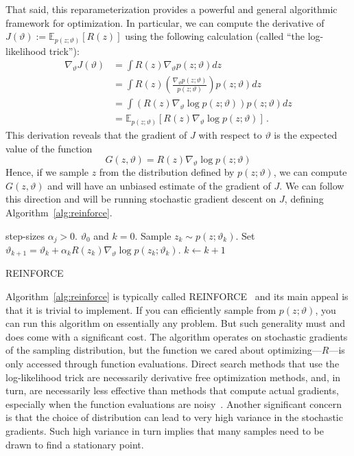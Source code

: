 \documentclass[11pt]{article}
\numberwithin{equation}{section}
\begin{document}
That said, this reparameterization provides a powerful and general algorithmic framework for optimization. In particular, we can compute the derivative of $J(\vartheta):= \mathbb{E}_{p(z;\vartheta)}[R(z)] $ using the following calculation (called ``the log-likelihood trick''):
\begin{align*}
	\nabla_{\vartheta} J(\vartheta) &= \int R(z) \nabla_{\vartheta} p(z;\vartheta) dz\\
	&= \int R(z) \left(\frac{\nabla_{\vartheta} p(z;\vartheta)}{p(z;\vartheta)}\right) p(z;\vartheta) dz\\
	&= \int \left( R(z) \nabla_{\vartheta} \log p(z;\vartheta) \right) p(z;\vartheta)dz	\\
  &= \mathbb{E}_{p(z;\vartheta)}\left[ R(z) \nabla_{\vartheta} \log p(z;\vartheta) \right]\,.
\end{align*}
This derivation reveals that the gradient of $J$ with respect to $\vartheta$ is the expected value of the function
\begin{equation}\label{eq:policy-grad}
	G(z,\vartheta) = R(z) \nabla_{\vartheta} \log p(z;\vartheta)
\end{equation}
Hence, if we sample $z$ from the distribution defined by $p(z;\vartheta)$, we can compute $G(z,\vartheta)$ and will have an unbiased estimate of the gradient of $J$. We can follow this direction and will be running stochastic gradient descent on $J$, defining Algorithm~\ref{alg:reinforce}.

\begin{center}
\begin{algorithm}[ht]
\begin{algorithmic}[1]
 step-sizes $\alpha_j>0$.
 $\vartheta_0$ and $k = 0$.
\STATE Sample $z_k\sim p(z;\vartheta_k)$.
\STATE Set $\vartheta_{k+1} = \vartheta_k + \alpha_k R(z_k) \nabla_\vartheta \log p(z_k; \vartheta_k)$.
\STATE $k\leftarrow k + 1$
\ENDWHILE
\end{algorithmic}
\caption{REINFORCE}
\label{alg:reinforce}
 \end{algorithm}
\end{center} 

Algorithm~\ref{alg:reinforce} is typically called REINFORCE~\cite{williams1992simple} and its main appeal is that it is trivial to implement. If you can efficiently sample from $p(z;\vartheta)$, you can run this algorithm on essentially any problem. But such generality must and does come with a significant cost. The algorithm operates on stochastic gradients of the sampling distribution, but the function we cared about optimizing---$R$---is only accessed through function evaluations. Direct search methods that use the log-likelihood trick are necessarily derivative free optimization methods, and, in turn, are necessarily less effective than methods that compute actual gradients, especially when the function evaluations are noisy~\cite{Jamieson12}. Another significant concern is that the choice of distribution can lead to very high variance in the stochastic gradients. Such high variance in turn implies that many samples need to be drawn to find a stationary point.
\end{document}
